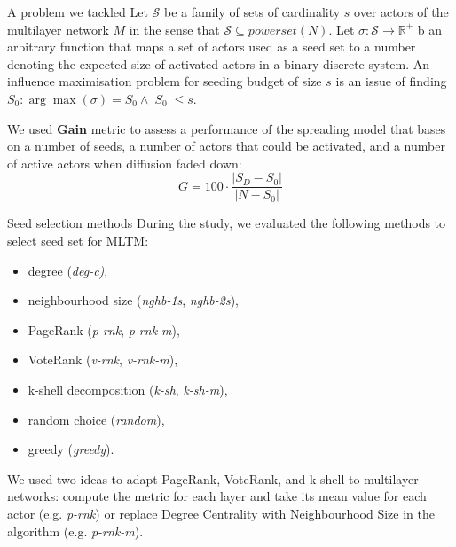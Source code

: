 \documentclass[final]{beamer}
\newlength{\colwidth}
\begin{document}
\begin{frame}[t]
\begin{columns}[t]
\begin{column}{\colwidth}
\begin{block}{A problem we tackled}
    Let $\mathcal{S}$ be a family of sets of cardinality $s$ over actors of
    the multilayer network $M$ in the sense that $\mathcal{S} \subseteq
    powerset(N)$. Let $\sigma: \mathcal{S} \rightarrow \mathbb{R^{+}}$ b
    an arbitrary function that maps a set of actors used as a seed set to
    a number denoting the expected size of activated actors in a binary discrete system. An influence maximisation problem for seeding budget of size $s$ is an issue of finding $ S_{0}: \arg\max(\sigma) = S_{0} \wedge |S_{0}| \leq s$.
    
    We used \textbf{Gain} metric to assess a performance of the spreading model that bases on a number of seeds, a number of actors that could be activated, and a number of active actors when diffusion faded down:
    \begin{equation*}
        G = 100 \cdot \frac{|S_{D} - S_{0}|}{|N - S_{0}|}
    \end{equation*}
\end{block}

\begin{block}{Seed selection methods}
    During the study, we evaluated the following methods to select seed set for MLTM:
    \begin{itemize}
        \item degree (\textit{deg-c)},
        \item neighbourhood size (\textit{nghb-1s}, \textit{nghb-2s}),
        \item PageRank (\textit{p-rnk}, \textit{p-rnk-m}),
        \item VoteRank (\textit{v-rnk}, \textit{v-rnk-m}),
        \item k-shell decomposition (\textit{k-sh}, \textit{k-sh-m}),
        \item random choice (\textit{random}),
        \item greedy (\textit{greedy}).
    \end{itemize}
    We used two ideas to adapt PageRank, VoteRank, and k-shell to multilayer networks: compute the metric for each layer and take its mean value for each actor (e.g. \textit{p-rnk}) or replace Degree Centrality with Neighbourhood Size in the algorithm (e.g. \textit{p-rnk-m}).
\end{block}

\end{column}


\end{columns}
\end{frame}
\end{document}
